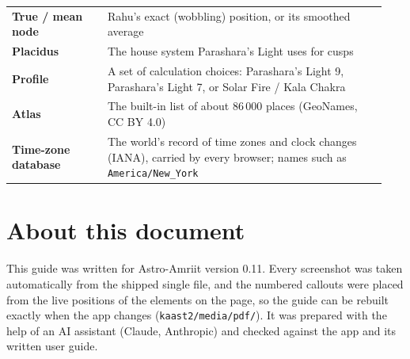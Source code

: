 \documentclass[11pt, a4paper]{article}
\newcommand{\app}{Astro-Amriit}
\newcommand{\PL}{Parashara's Light}
\newcommand{\ex}[1]{\texttt{#1}}             %
\begin{document}
\begin{longtable}{>{\bfseries}p{0.24\linewidth} >{\raggedright\arraybackslash}p{0.70\linewidth}}
True / mean node & Rahu's exact (wobbling) position, or its smoothed average \\
Placidus & The house system \PL{} uses for cusps \\
Profile & A set of calculation choices: \PL{} 9, \PL{} 7, or Solar Fire / Kala Chakra \\
Atlas & The built-in list of about 86\,000 places (GeoNames, CC BY 4.0) \\
Time-zone database & The world's record of time zones and clock changes (IANA), carried by every browser; names such as \ex{America/New\_York} \\
\bottomrule
\end{longtable}

\section*{About this document}
This guide was written for \app{} version 0.11. Every screenshot was taken automatically from the shipped
single file, and the numbered callouts were placed from the live positions of the elements on the page, so
the guide can be rebuilt exactly when the app changes (\ex{kaast2/media/pdf/}). It was prepared with the
help of an AI assistant (Claude, Anthropic) and checked against the app and its written user guide.
\end{document}
